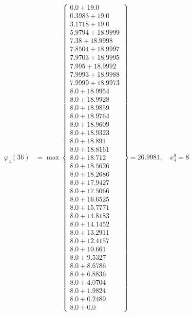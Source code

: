 \documentclass{article}
\begin{document}
\begin{align*}
\varphi_{4}(36) &= \max \left\{ \begin{array}{c}
0.0 + 19.0 \\
 0.3983 + 19.0 \\
 3.1718 + 19.0 \\
 5.9794 + 18.9999 \\
 7.38 + 18.9998 \\
 7.8504 + 18.9997 \\
 7.9703 + 18.9995 \\
 7.995 + 18.9992 \\
 7.9993 + 18.9988 \\
 7.9999 + 18.9973 \\
 8.0 + 18.9954 \\
 8.0 + 18.9928 \\
 8.0 + 18.9859 \\
 8.0 + 18.9764 \\
 8.0 + 18.9609 \\
 8.0 + 18.9323 \\
 8.0 + 18.891 \\
 8.0 + 18.8161 \\
 8.0 + 18.712 \\
 8.0 + 18.5626 \\
 8.0 + 18.2686 \\
 8.0 + 17.9427 \\
 8.0 + 17.5066 \\
 8.0 + 16.6525 \\
 8.0 + 15.7771 \\
 8.0 + 14.8183 \\
 8.0 + 14.1452 \\
 8.0 + 13.2911 \\
 8.0 + 12.4157 \\
 8.0 + 10.661 \\
 8.0 + 9.5327 \\
 8.0 + 8.6786 \\
 8.0 + 6.8836 \\
 8.0 + 4.0704 \\
 8.0 + 1.9824 \\
 8.0 + 0.2489 \\
 8.0 + 0.0
\end{array} \right\}=26.9981, \quad x_{4}^0=8\\
  
 \\ 
\end{align*}
\end{document}
